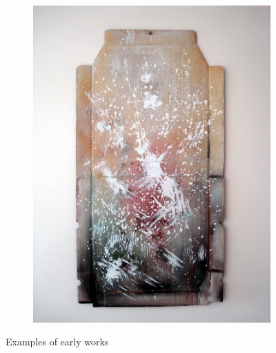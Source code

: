 \begin{figure}
\begin{subfigure}[b]{0.30\textwidth}
        \includegraphics[width=\textwidth]{project_graphics/early_works3.jpg}
    \end{subfigure}
    \caption{Examples of early works}
    \label{fig:EarlyWorks}
\end{figure}





